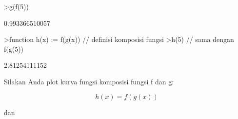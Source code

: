 \documentclass[a4paper,10pt]{article}
\begin{document}
\begin{eulernotebook}
\begin{eulercomment}
\begin{eulercomment}
\begin{eulercomment}
\begin{eulercomment}
\begin{eulercomment}
\begin{eulercomment}
\begin{eulercomment}
\begin{eulercomment}
\begin{eulercomment}
\begin{eulercomment}
\begin{eulercomment}
\begin{eulercomment}
\begin{eulercomment}
\begin{eulercomment}
\begin{eulercomment}
\begin{eulercomment}
\begin{eulerprompt}
>g(f(5))
\end{eulerprompt}
\begin{euleroutput}
  0.993366510057
\end{euleroutput}
\begin{eulerprompt}
>function h(x) := f(g(x)) // definisi komposisi fungsi 
>h(5) // sama dengan f(g(5))
\end{eulerprompt}
\begin{euleroutput}
  2.81254111152
\end{euleroutput}
\begin{eulercomment}
Silakan Anda plot kurva fungsi komposisi fungsi f dan g:

\end{eulercomment}
\begin{eulerformula}
\[
h(x)=f(g(x))
\]
\end{eulerformula}
\begin{eulercomment}
dan


\end{eulercomment}
\end{eulercomment}
\end{eulercomment}
\end{eulercomment}
\end{eulercomment}
\end{eulercomment}
\end{eulercomment}
\end{eulercomment}
\end{eulercomment}
\end{eulercomment}
\end{eulercomment}
\end{eulercomment}
\end{eulercomment}
\end{eulercomment}
\end{eulercomment}
\end{eulercomment}
\end{eulercomment}
\end{eulernotebook}
\end{document}
